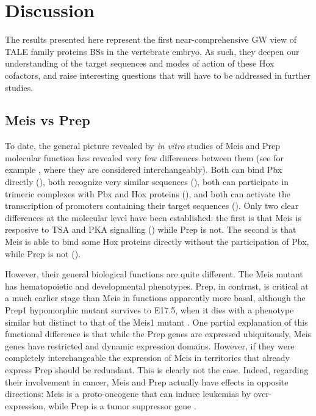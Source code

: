 \chapter{Discussion}
\thispagestyle{cleared}
\cleardoublepage
\label{chp:discussion}

The results presented here represent the first near-comprehensive \ac{GW} view of \ac{TALE} family proteins \acp{BS} in the vertebrate embryo. As such, they deepen our understanding of the target sequences and modes of action of these Hox cofactors, and raise interesting questions that will have to be addressed in further studies. 

\section{Meis vs Prep}

To date, the general picture revealed by \textit{in vitro} studies of Meis and Prep molecular function has revealed very few differences between them (see for example \textcite{Moens2006}, where they are considered interchangeably). Both can bind Pbx directly (\cite{Knoepfler1997, Shen1997}), both recognize very similar sequences (\cite{Knoepfler1997, Chang1997}), both can participate in trimeric complexes with Pbx and Hox proteins (\cite{Berthelsen1998, Shen1999}), and both can activate the transcription of promoters containing their target sequences (\cite{Berthelsen1998, Jacobs1999}). Only two clear differences at the molecular level have been established: the first is that Meis is resposive to \ac{TSA} and \ac{PKA} signalling (\cite{Huang2005}) while Prep is not. The second is that Meis is able to bind some Hox proteins directly without the participation of Pbx, while Prep is not (\cite{Williams2005}).

However, their general biological functions are quite different. The Meis mutant has hematopoietic and developmental phenotypes. Prep, in contrast, is critical at a much earlier stage than Meis in functions apparently more basal, although the Prep1 hypomorphic mutant survives to E17.5, when it dies with a phenotype similar but distinct to that of the Meis1 mutant \parencite{Ferretti2006, DiRosa2007}. One partial explanation of this functional difference is that while the Prep genes are expressed ubiquitously, Meis genes have restricted and dynamic expression domains. However, if they were completely interchangeable the expression of Meis in territories that already express Prep should be redundant. This is clearly not the case. Indeed, regarding their involvement in cancer, Meis and Prep actually have effects in opposite directions: Meis is a proto-oncogene that can induce leukemias by over-expression, while Prep is a tumor suppressor gene \parencite{Moskow1995, Thorsteinsdottir2001, Iotti2011, Longobardi2010, Wong2007}. %

